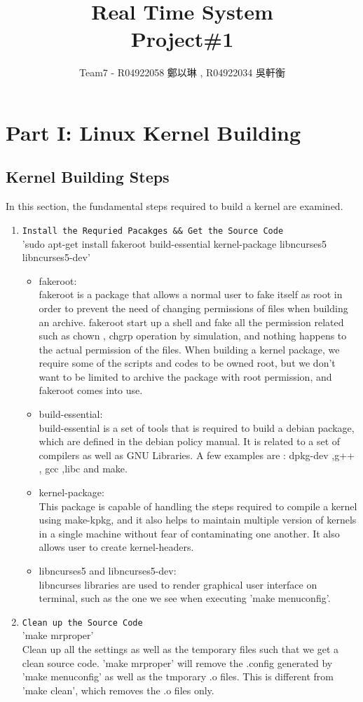 \documentclass[12pt]{article}
\title{\textbf{Real Time System}\\ Project\#1}
\author{Team7 - R04922058 鄭以琳 , R04922034 吳軒衡}
\date{}
\begin{document}
\maketitle

\section{Part I: Linux Kernel Building}
\subsection*{Kernel Building Steps}
	In this section, the fundamental steps required to build a kernel are examined.
\begin{enumerate}
\item \verb|Install the Requried Pacakges && Get the Source Code|\\
'sudo apt-get install fakeroot build-essential kernel-package libncurses5 libncurses5-dev'
\begin{itemize}
\item fakeroot:\\
	fakeroot is a package that allows a normal user to fake itself as root in order to prevent the need of changing permissions of files when building an archive. fakeroot start up a shell and fake all the permission related such as chown , chgrp operation by simulation, and nothing happens to the actual permission of the files. When building a kernel package, we require some of the scripts and codes to be owned root, but we don't want to be limited to archive the package with root permission, and fakeroot comes into use.
\item build-essential:\\
	build-essential is a set of tools that is required to build a debian package, which are defined in the debian policy manual. It is related to a set of compilers as well as GNU Libraries. A few examples are : dpkg-dev ,g++ , gcc ,libc and make.
\item kernel-package:\\
	This package is capable of handling the steps required to compile a kernel using make-kpkg, and it also helps to maintain multiple version of kernels in a single machine without fear of contaminating one another. It also allows user to create kernel-headers.
\item libncurses5 and libncurses5-dev:\\
	libncurses libraries are used to render graphical user interface on terminal, such as the one we see when executing 'make menuconfig'.
\end{itemize}	
\item \verb|Clean up the Source Code|\\
	'make mrproper'\\
	Clean up all the settings as well as the temporary files such that we get a clean source code. 'make mrproper' will remove the .config generated by 'make menuconfig' as well as the tmporary .o files.
	This is different from 'make clean', which removes the .o files only.


\end{enumerate}
\end{document}
